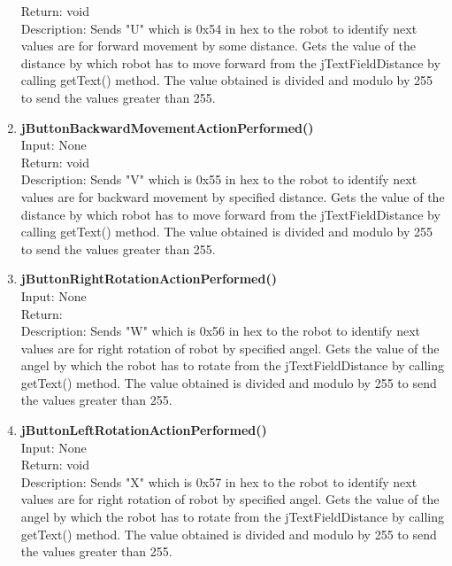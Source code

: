 \documentclass{article}
\begin{document}
\begin{enumerate}
		Return: void\\
		Description: Sends "U" which is 0x54 in hex to the robot to identify next values are for forward movement by some distance. Gets the value of the distance by which robot has to move forward from the jTextFieldDistance by calling getText() method. The value obtained is divided and modulo by 255 to send the values greater than 255.  \vspace{0.5cm} \\    
		\item \textbf{jButtonBackwardMovementActionPerformed()} \vspace{0.25cm} \\
		Input: None \\
		Return: void\\
		Description: Sends "V" which is 0x55 in hex to the robot to identify next values are for backward movement by specified distance. Gets the value of the distance by which robot has to move forward from the jTextFieldDistance by calling getText() method. The value obtained is divided and modulo by 255 to send the values greater than 255. \vspace{0.5cm} \\
		\item \textbf{jButtonRightRotationActionPerformed()} \vspace{0.25cm} \\
		Input: None \\
		Return: \\
		Description: Sends "W" which is 0x56 in hex to the robot to identify next values are for right rotation of robot by specified angel. Gets the value of the angel by which the robot has to rotate from the jTextFieldDistance by calling getText() method. The value obtained is divided and modulo by 255 to send the values greater than 255. \vspace{0.5cm} \\
		\item \textbf{jButtonLeftRotationActionPerformed()} \vspace{0.25cm} \\
		Input: None\\
		Return: void\\
		Description: Sends "X" which is 0x57 in hex to the robot to identify next values are for right rotation of robot by specified angel. Gets the value of the angel by which the robot has to rotate from the jTextFieldDistance by calling getText() method. The value obtained is divided and modulo by 255 to send the values greater than 255. \vspace{0.5cm} \\

\end{enumerate}
\end{document}
